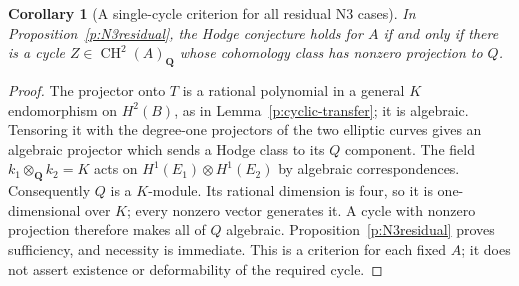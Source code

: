 \documentclass[10pt,reqno]{article}
\theoremstyle{emphasizedplain}
\newtheorem{corollary}[theorem]{Corollary}
\theoremstyle{emphasizeddefinition}
\theoremstyle{emphasizeddefinition}
\DeclareMathOperator{\CH}{CH}
\newcommand{\Q}{\mathbf Q}
\begin{document}
\begin{corollary}[A single-cycle criterion for all residual N3 cases]
\label{p:N3onecycle}
In Proposition~\ref{p:N3residual}, the Hodge conjecture holds for
$A$ if and only if there is a cycle $Z\in\CH^2(A)_\Q$ whose
cohomology class has nonzero projection to $Q$.
\end{corollary}
\begin{proof}
The projector onto $T$ is a rational polynomial in a general
$K$ endomorphism on $H^2(B)$, as in
Lemma~\ref{p:cyclic-transfer}; it is algebraic. Tensoring it with
the degree-one projectors of the two elliptic curves gives an
algebraic projector which sends a Hodge class to its $Q$ component.
The field $k_1\otimes_\Q k_2=K$ acts on
$H^1(E_1)\otimes H^1(E_2)$ by algebraic correspondences.
Consequently $Q$ is a $K$-module. Its rational dimension is four,
so it is one-dimensional over $K$; every nonzero vector generates
it. A cycle with nonzero projection therefore makes all of $Q$
algebraic. Proposition~\ref{p:N3residual} proves sufficiency, and
necessity is immediate. This is a criterion for each fixed $A$;
it does not assert existence or deformability of the required cycle.
\end{proof}
\end{document}
